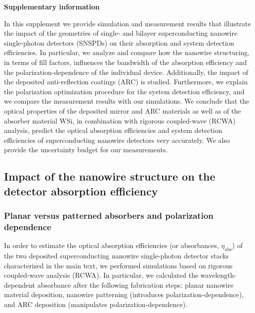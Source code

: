 \documentclass[aip,apl,showpacs,showkeys,preprint,superscriptaddress,preprintnumbers,amsmath,amssymb]{revtex4-1}
\begin{document}
\clearpage

\setcounter{figure}{0}
\renewcommand{\thefigure}{S\arabic{figure}}
\renewcommand{\theequation}{S\arabic{equation}}
\renewcommand{\thetable}{S\arabic{table}}
\renewcommand{\bibnumfmt}[1]{[S#1]}
\renewcommand{\citenumfont}[1]{S#1}

\begin{bibunit}
\begin{center}
\textbf{Supplementary information}
\end{center}

In this supplement we provide simulation and measurement results that illustrate the impact of the geometries of single- and bilayer superconducting nanowire single-photon detectors (SNSPDs) on their absorption and system detection efficiencies. In particular, we analyze and compare how the nanowire structuring, in terms of fill factors, influences the bandwidth of the absorption efficiency and the polarization-dependence of the individual device. Additionally, the impact of the deposited anti-reflection coatings (ARC) is studied. Furthermore, we explain the polarization optimization procedure for the system detection efficiency, and we compare the measurement results with our simulations. We conclude that the optical properties of the deposited mirror and ARC materials as well as of the absorber material WSi, in combination with rigorous coupled-wave (RCWA) analysis, predict the optical absorption efficiencies and system detection efficiencies of superconducting nanowire detectors very accurately. We also provide the uncertainty budget for our measurements.



\subsection{Impact of the nanowire structure on the detector absorption efficiency}

\subsubsection{Planar versus patterned absorbers and polarization dependence}

In order to estimate the optical absorption efficiencies (or absorbances, $\eta_\mathrm{abs}$) of the two deposited superconducting nanowire single-photon detector stacks characterized in the main text, we performed simulations based on rigorous coupled-wave analysis (RCWA). In particular, we calculated the wavelength-dependent absorbance after the following fabrication steps: planar nanowire material deposition, nanowire patterning (introduces polarization-dependence), and ARC deposition (manipulates polarization-dependence).


\end{bibunit}
\end{document}
